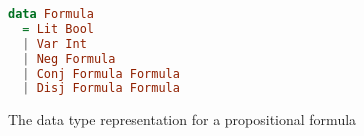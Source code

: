 \begin{lstlisting}[language=Haskell]
data Formula
  = Lit Bool 
  | Var Int 
  | Neg Formula 
  | Conj Formula Formula 
  | Disj Formula Formula
\end{lstlisting}
\caption{The data type representation for a propositional formula}
\label{fig:chap1:propFormula}